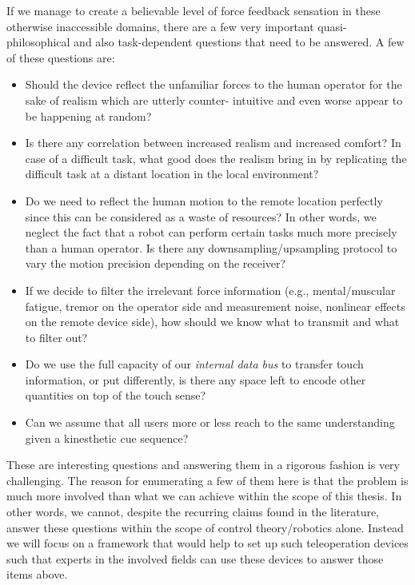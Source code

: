 If we manage to create a believable level of force feedback sensation in these otherwise inaccessible domains, there are a few very 
important quasi-philosophical and also task-dependent questions that need to be answered. A few of these questions are:

\begin{itemize}
	\item Should the device reflect the unfamiliar forces to the human operator for the sake of realism which are utterly counter-%
intuitive and even worse appear to be happening at random? 
    \item Is there any correlation between increased realism and increased comfort? In case of a difficult task, what good does the 
    realism bring in by replicating the difficult task at a distant location in the local environment?
    \item Do we need to reflect the human motion to the remote location perfectly since this can be considered as a waste of resources? 
    In other words, we neglect the fact that a robot can perform certain tasks much more precisely than a human operator. Is there any 
    downsampling/upsampling protocol to vary the motion precision depending on the receiver?
    \item If we decide to filter the irrelevant force information (e.g., mental/muscular fatigue, tremor on the operator side and 
    measurement noise, nonlinear effects  on the remote device side), how should we know what to transmit and what to filter out? 
    \item Do we use the full capacity of our \emph{internal data bus} to transfer touch information, or put differently, is there any 
space left to encode other quantities on top of the touch sense?
    \item Can we assume that all users more or less reach to the same understanding given a kinesthetic cue sequence?
\end{itemize}

These are interesting questions and answering them in a rigorous fashion is very challenging. The reason for enumerating a few of 
them here is that the problem is much more involved than what we can achieve within the scope of this thesis. In other words, we 
cannot, despite the recurring claims found in the literature, answer these questions within the scope of control theory/robotics alone. 
Instead we will focus on a framework that would help to set up such teleoperation devices such that experts in the involved fields 
can use these devices to answer those items above. 



